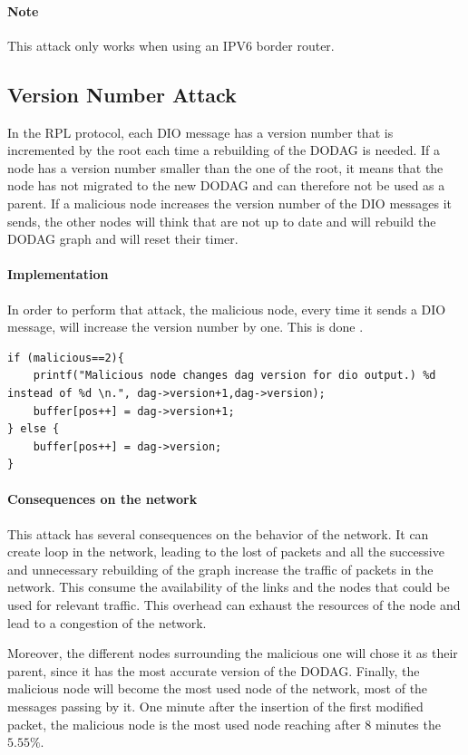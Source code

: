 \documentclass{report}
\begin{document}
\paragraph{Note} This attack only works when using an IPV6 border router.


\subsection{Version Number Attack}
In the \textsc{RPL} protocol, each \textsc{DIO} message has a version number that is
incremented by the root each time a rebuilding of the \textsc{DODAG} is needed.
If a node has a version number smaller than the one of the root, it
means that the node has not migrated to the new \textsc{DODAG} and can therefore
not be used as a parent. If a malicious node increases the version
number of the \textsc{DIO} messages it sends, the other nodes will think that are
not up to date and will rebuild the \textsc{DODAG} graph and will reset their
timer.

\paragraph{Implementation}
In order to perform that attack, the malicious node, every time it sends
a \textsc{DIO} message, will increase the version number by one. This is done .

\begin{lstlisting}[caption={Version number attack done in
the rpl-icmp6.c file in the method dis\_output}]
if (malicious==2){
    printf("Malicious node changes dag version for dio output.) %d instead of %d \n.", dag->version+1,dag->version);
	buffer[pos++] = dag->version+1;
} else {
	buffer[pos++] = dag->version;
}
\end{lstlisting}

\paragraph{Consequences on the network}
This attack has several consequences on the behavior of the network. It
can create loop in the network, leading to the lost of packets and all
the successive and unnecessary rebuilding of the graph increase the
traffic of packets in the network. This consume the availability of the
links and the nodes that could be used for relevant traffic. This
overhead can exhaust the resources of the node and lead to a congestion
of the network. 


Moreover, the different nodes surrounding the malicious one will chose
it as their parent, since it has the most accurate version of the \textsc{DODAG}.
Finally, the malicious node will become the most used node of the
network, most of the messages passing by it. One minute after the
insertion of the first modified packet, the malicious node is the most
used node reaching after $8$ minutes the $5.55\%$. 
\end{document}
